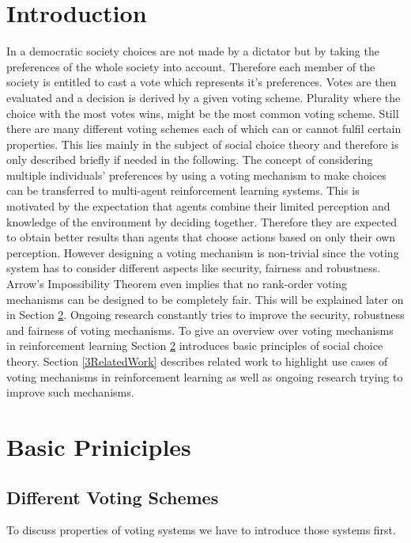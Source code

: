 \documentclass[conference]{IEEEtran}
\begin{document}
\section{Introduction}
In a democratic society choices are not made by a dictator but by taking the preferences of the whole society into account. Therefore each member of the society is entitled to cast a vote which represents it's preferences. Votes are then evaluated and a decision is derived by a given voting scheme. Plurality where the choice with the most votes wins, might be the most common voting scheme. Still there are many different voting schemes each of which can or cannot fulfil certain properties. This lies mainly in the subject of social choice theory and therefore is only described briefly if needed in the following.
\newline
The concept of considering multiple individuals' preferences by using a voting mechanism to make choices can be transferred to multi-agent reinforcement learning systems. This is motivated by the expectation that agents combine their limited perception and knowledge of the environment by deciding together. Therefore they are expected to obtain better results than agents that choose actions based on only their own perception.\cite{partalas2008hybrid}
\newline
However designing a voting mechanism is non-trivial since the voting system has to consider different aspects like security, fairness and robustness\cite{pitt2006voting}.
Arrow's Impossibility Theorem even implies that no rank-order voting mechanisms can be designed to be completely fair. This will be explained later on in Section \ref{2BasicPrinciples}.
Ongoing research constantly tries to improve the security, robustness and fairness of voting mechanisms.
\newline
To give an overview over voting mechanisms in reinforcement learning Section \ref{2BasicPrinciples} introduces basic principles of social choice theory.
Section \ref{3RelatedWork} describes related work to highlight use cases of voting mechanisms in reinforcement learning as well as ongoing research trying to improve such mechanisms.

\section{Basic Priniciples}\label{2BasicPrinciples}

\subsection{Different Voting Schemes}
To discuss properties of voting systems we have to introduce those systems first.
\end{document}
